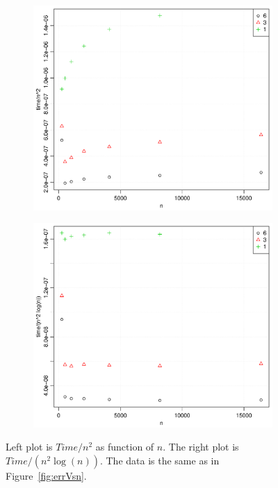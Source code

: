 \begin{figure}[h!]
  \centering
  \begin{subfigure}[b]{0.48\textwidth}
    \includegraphics[width=\textwidth]{./Figures/timeOverN2Vsn.pdf}
  \end{subfigure}%
  \quad
  \begin{subfigure}[b]{0.48\textwidth}
    \includegraphics[width=\textwidth]{./Figures/timeOverN2LogNVsn.pdf}
  \end{subfigure}
  \vspace{-0.1\baselineskip}
  \caption{Left plot is $Time/n^2$ as function of $n$. The right plot is $Time/(n^2 \log (n))$. The data is the same as in Figure~\ref{fig:errVsn}.}
  \label{fig:timeVsn}
\end{figure}

